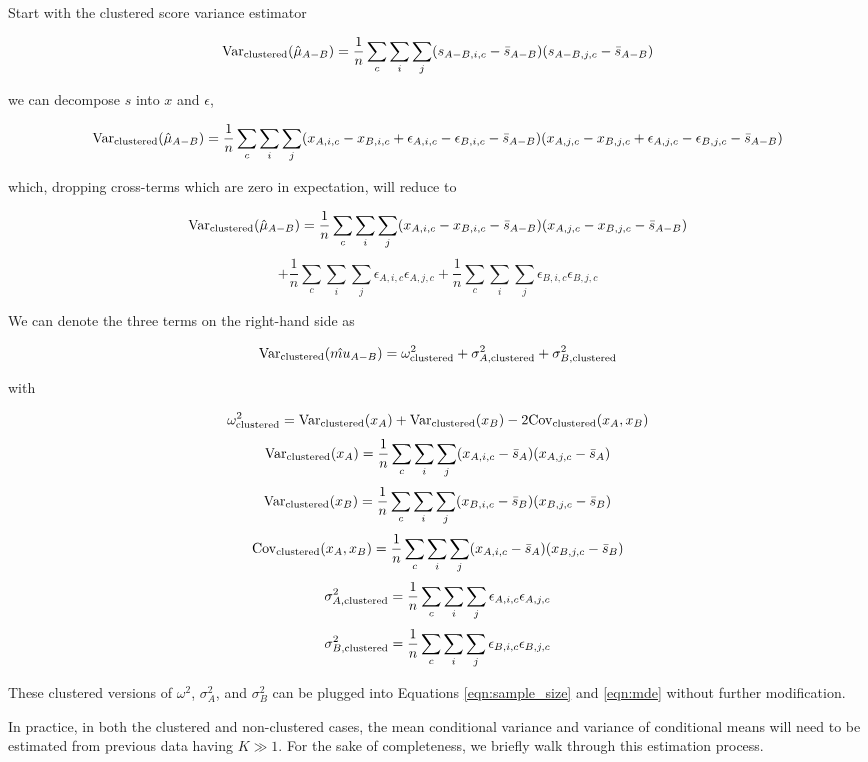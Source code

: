 \documentclass[11pt, oneside]{article}   	%
\newcommand{\Var}{\mathrm{Var}}
\newcommand{\Cov}{\mathrm{Cov}}
\begin{document}
Start with the clustered score variance estimator

\[
\Var_{\rm clustered}(\hat{\mu}_{A-B})=\frac{1}{n}\sum_c \sum_i \sum_j (s_{A-B, i, c} - \bar{s}_{A-B})(s_{A-B, j, c}-\bar{s}_{A-B})
\]

we can decompose $s$ into $x$ and $\epsilon$,

\[
\Var_{\rm clustered}(\hat{\mu}_{A-B}) = \frac{1}{n}\sum_c \sum_i \sum_j (x_{A, i, c} - x_{B, i, c} + \epsilon_{A, i, c} - \epsilon_{B, i, c} - \bar{s}_{A-B})(x_{A, j, c} - x_{B, j, c} + \epsilon_{A, j, c} - \epsilon_{B, j, c}-\bar{s}_{A-B})
\]

which, dropping cross-terms which are zero in expectation, will reduce to

\[
\Var_{\rm clustered}(\hat{\mu}_{A-B}) = \frac{1}{n}\sum_c \sum_i \sum_j (x_{A, i, c} - x_{B, i, c} - \bar{s}_{A-B})(x_{A, j, c} - x_{B, j, c} -\bar{s}_{A-B})
\]
\[ + \frac{1}{n}\sum_c \sum_i \sum_j \epsilon_{A, i, c} \epsilon_{A, j, c} + \frac{1}{n} \sum_c \sum_i \sum_j \epsilon_{B, i, c} \epsilon_{B, j, c}
\]

We can denote the three terms on the right-hand side as

\[
\Var_{\rm clustered}(\hat{mu}_{A-B}) = \omega_{\rm clustered}^2 + \sigma_{A, {\rm clustered}}^2 + \sigma_{B, {\rm clustered}}^2
\]

with

\[
\omega_{\rm clustered}^2 = \Var_{\rm clustered}(x_A)+\Var_{\rm clustered}(x_B)-2\Cov_{\rm clustered}(x_A, x_B)
\]
\[
\Var_{\rm clustered}(x_A)=\frac{1}{n}\sum_c \sum_i \sum_j (x_{A, i, c}-\bar{s}_A)(x_{A, j, c}-\bar{s}_A)
\]
\[
\Var_{\rm clustered}(x_B)=\frac{1}{n}\sum_c \sum_i \sum_j (x_{B, i, c}-\bar{s}_B)(x_{B, j, c}-\bar{s}_B)
\]
\[
\Cov_{\rm clustered}(x_A, x_B)=\frac{1}{n}\sum_c \sum_i \sum_j (x_{A, i, c}-\bar{s}_A)(x_{B, j, c}-\bar{s}_B)
\]
\[
\sigma_{A, {\rm clustered}}^2 = \frac{1}{n} \sum_c \sum_i \sum_j \epsilon_{A, i, c} \epsilon_{A, j, c}
\]
\[
\sigma_{B, {\rm clustered}}^2 = \frac{1}{n} \sum_c \sum_i \sum_j \epsilon_{B, i, c} \epsilon_{B, j, c}
\]

These clustered versions of $\omega^2$, $\sigma_A^2$, and $\sigma_B^2$ can be plugged into Equations \ref{eqn:sample_size} and \ref{eqn:mde} without further modification.

In practice, in both the clustered and non-clustered cases, the mean conditional variance and variance of conditional means will need to be estimated from previous data having $K\gg 1$. For the sake of completeness, we briefly walk through this estimation process.
\end{document}
